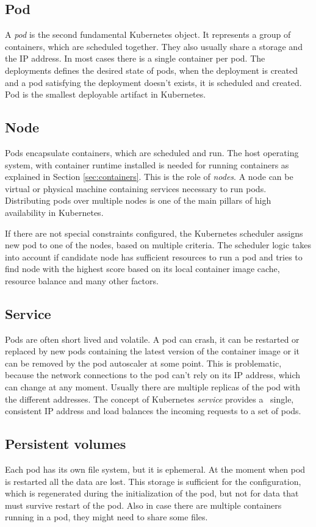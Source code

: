 \documentclass[
  digital, %
  twoside, %
  table,   %
  lof,     %
  lot,     %
]{fithesis3}
\begin{document}
\subsection{Pod} \label{sec:pod}
A \textit{pod} is the second fundamental Kubernetes object. It represents a group of containers, which are scheduled together. They also usually share a storage and the IP address. In most cases there is a single container per pod. The deployments defines the desired state of pods, when the deployment is created and a pod satisfying the deployment doesn't exists, it is scheduled and created. Pod is the smallest deployable artifact in Kubernetes.

\subsection{Node} \label{sec:node}
Pods encapsulate containers, which are scheduled and run. The host operating system, with container runtime installed is needed for running containers as explained in Section \ref{sec:containers}. This is the role of \textit{nodes}. A node can be virtual or physical machine containing services necessary to run pods. Distributing pods over multiple nodes is one of the main pillars of high availability in Kubernetes.

If there are not special constraints configured, the Kubernetes scheduler \cite{kube-scheduler} assigns new pod to one of the nodes, based on multiple criteria. The scheduler logic takes into account if candidate node has sufficient resources to run a pod and tries to find node with the highest score based on its local container image cache, resource balance and many other factors.

\subsection{Service} \label{sec:service}
Pods are often short lived and volatile. A pod can crash, it can be restarted or replaced by new pods containing the latest version of the container image or it can be removed by the pod autoscaler \cite{hpa} at some point. This is problematic, because the network connections to the pod can't rely on its IP address, which can change at any moment. Usually there are multiple replicas of the pod with the different addresses. The concept of Kubernetes \textit{service} provides a \
single, consistent IP address and load balances the incoming requests to a set of pods.

\subsection{Persistent volumes} \label{sec:pv}
Each pod has its own file system, but it is ephemeral. At the moment when pod is restarted all the data are lost. This storage is sufficient for the configuration, which is regenerated during the initialization of the pod, but not for data that must survive restart of the pod. Also in case there are multiple containers running in a pod, they might need to share some files.
\end{document}
